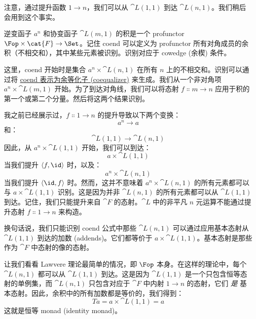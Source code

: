 \noindent
注意，通过提升函数 $1 \to n$，我们可以从 $\cat{L}(1, 1)$ 到达 $\cat{L}(n, 1)$。我们稍后会用到这个事实。

逆变函子 $a^n$ 和协变函子 $\cat{L}(m, 1)$ 的积是一个 profunctor $\Fop \times \cat{F} \to \Set$。记住 coend 可以定义为 profunctor 所有对角成员的余积（不相交和），其中某些元素被识别。识别对应于 cowedge (余楔) 条件。

这里，coend 开始时是集合 $a^n \times \cat{L}(n, 1)$ 在所有 $n$ 上的不相交和。识别可以通过将 \hyperref[ends-and-coends]{coend 表示为余等化子 (coequalizer)} 来生成。我们从一个非对角项 $a^n \times \cat{L}(m, 1)$ 开始。为了到达对角线，我们可以将态射 $f \Colon m \to n$ 应用于积的第一个或第二个分量。然后将这两个结果识别。

\begin{figure}[H]
  \centering
\end{figure}

\noindent
我之前已经展示过，$f \Colon 1 \to n$ 的提升导致以下两个变换：
\[a^n \to a\]
和：
\[\cat{L}(1, 1) \to \cat{L}(n, 1)\]
因此，从 $a^n \times \cat{L}(1, 1)$ 开始，我们可以到达：
\[a \times \cat{L}(1, 1)\]
当我们提升 $\langle f, \id \rangle$ 时，以及：
\[a^n \times \cat{L}(n, 1)\]
当我们提升 $\langle \id, f \rangle$ 时。然而，这并不意味着 $a^n \times \cat{L}(n, 1)$ 的所有元素都可以与 $a \times \cat{L}(1, 1)$ 识别。这是因为并非 $\cat{L}(n, 1)$ 的所有元素都可以从 $\cat{L}(1, 1)$ 到达。记住，我们只能提升来自 $\cat{F}$ 的态射。$\cat{L}$ 中的非平凡 $n$ 元运算不能通过提升态射 $f \Colon 1 \to n$ 来构造。

换句话说，我们只能识别 coend 公式中那些 $\cat{L}(n, 1)$ 可以通过应用基本态射从 $\cat{L}(1, 1)$ 到达的加数 (addends)。它们都等价于 $a \times \cat{L}(1, 1)$。基本态射是那些作为 $\cat{F}$ 中态射的像的态射。

让我们看看 Lawvere 理论最简单的情况，即 $\Fop$ 本身。在这样的理论中，每个 $\cat{L}(n, 1)$ 都可以从 $\cat{L}(1, 1)$ 到达。这是因为 $\cat{L}(1, 1)$ 是一个只包含恒等态射的单例集，而 $\cat{L}(n, 1)$ 只包含对应于 $\cat{F}$ 中内射 $1 \to n$ 的态射，它们 \emph{是} 基本态射。因此，余积中的所有加数都是等价的，我们得到：
\[T a = a \times \cat{L}(1, 1) = a\]
这就是恒等 monad (identity monad)。

